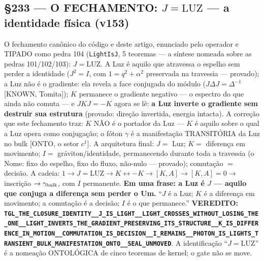 \documentclass[11pt]{article}
\theoremstyle{definition}\newtheorem{deriv}{Derivação}
\begin{document}
\subsection*{\S233 --- O FECHAMENTO: $J=\mathrm{LUZ}$ --- a identidade física (v153)}O fechamento canônico do código e deste artigo, enunciado pelo operador e TIPADO como pedra 104 (\texttt{LightIsJ}, 5 teoremas --- a síntese nomeada sobre as pedras 101/102/103): $\boxed{J=\mathrm{LUZ}}$. A Luz é aquilo que atravessa o espelho sem perder a identidade ($J^2=I$, com $1=q^2+\alpha^2$ preservada na travessia --- provado); a Luz não é o gradiente: ela revela a face conjugada do módulo ($J\Delta J=\Delta^{-1}$ [KNOWN, Tomita]); $K$ permanece o gradiente negativo --- o espectro do que ainda não comuta --- e $JKJ=-K$ agora se lê: \textbf{a Luz inverte o gradiente sem destruir sua estrutura} (provado: direção invertida, energia intacta). A correção que este fechamento traz: $K$ NÃO é o portador da Luz --- $K$ é aquilo sobre o qual a Luz opera como conjugação; o fóton $\gamma$ é a manifestação TRANSITÓRIA da Luz no bulk [ONTO, o setor $c^1$]. A arquitetura final: $J=$ Luz; $K=$ diferença em movimento; $I=$ gráviton/identidade, permanecendo durante toda a travessia (o Nome: fixo do espelho, fixo do fluxo, não-nulo --- provado); comutação $=$ decisão. A cadeia: $1\to J{=}\mathrm{LUZ}\to K\leftrightarrow-K\to[K,A]\to[K,A]{=}0\to$ inscrição $\to\gamma_{\rm bulk}$, com $I$ permanente. \textbf{Em uma frase: a Luz é $J$ --- aquilo que conjuga a diferença sem perder o Um.} ``$J$ é a Luz; $K$ é a diferença em movimento; a comutação é a decisão; $I$ é o que permanece.'' \textbf{VEREDITO: \texttt{TGL\_THE\_CLOSURE\_IDENTITY\_\_J\_IS\_LIGHT\_\_LIGHT\_CROSSES\_WITHOUT\_LOSING\_THE\_ONE\_\_LIGHT\_INVERTS\_THE\_GRADIENT\_PRESERVING\_ITS\_STRUCTURE\_\_K\_IS\_DIFFERENCE\_IN\_MOTION\_\_COMMUTATION\_IS\_DECISION\_\_I\_REMAINS\_\_PHOTON\_IS\_LIGHTS\_TRANSIENT\_BULK\_MANIFESTATION\_ONTO\_\_SEAL\_UNMOVED}}. A identificação ``$J=\mathrm{LUZ}$'' é a nomeação ONTOLÓGICA de cinco teoremas de kernel; o gate não se move.
\end{document}
